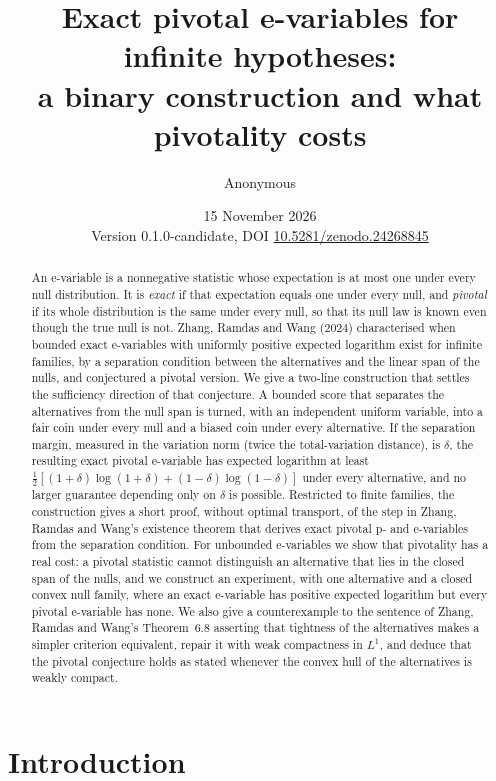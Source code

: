 \documentclass[11pt,a4paper]{article}
\title{Exact pivotal e-variables for infinite hypotheses:\\
a binary construction and what pivotality costs}
\author{Anonymous}
\date{15 November 2026\\[2pt]\small Version 0.1.0-candidate, DOI \href{https://doi.org/10.5281/zenodo.24268845}{10.5281/zenodo.24268845}}
\theoremstyle{definition}
\theoremstyle{remark}
\begin{document}
\maketitle

\begin{abstract}
An e-variable is a nonnegative statistic whose expectation is at most one under every null distribution. It is \emph{exact} if that expectation equals one under every null, and \emph{pivotal} if its whole distribution is the same under every null, so that its null law is known even though the true null is not. Zhang, Ramdas and Wang (2024) characterised when bounded exact e-variables with uniformly positive expected logarithm exist for infinite families, by a separation condition between the alternatives and the linear span of the nulls, and conjectured a pivotal version. We give a two-line construction that settles the sufficiency direction of that conjecture. A bounded score that separates the alternatives from the null span is turned, with an independent uniform variable, into a fair coin under every null and a biased coin under every alternative. If the separation margin, measured in the variation norm (twice the total-variation distance), is \(\delta\), the resulting exact pivotal e-variable has expected logarithm at least \(\tfrac12[(1+\delta)\log(1+\delta)+(1-\delta)\log(1-\delta)]\) under every alternative, and no larger guarantee depending only on \(\delta\) is possible. Restricted to finite families, the construction gives a short proof, without optimal transport, of the step in Zhang, Ramdas and Wang's existence theorem that derives exact pivotal p- and e-variables from the separation condition. For unbounded e-variables we show that pivotality has a real cost: a pivotal statistic cannot distinguish an alternative that lies in the closed span of the nulls, and we construct an experiment, with one alternative and a closed convex null family, where an exact e-variable has positive expected logarithm but every pivotal e-variable has none. We also give a counterexample to the sentence of Zhang, Ramdas and Wang's Theorem~6.8 asserting that tightness of the alternatives makes a simpler criterion equivalent, repair it with weak compactness in \(L^1\), and deduce that the pivotal conjecture holds as stated whenever the convex hull of the alternatives is weakly compact.
\end{abstract}

\section{Introduction}\label{sec:intro}
\end{document}

